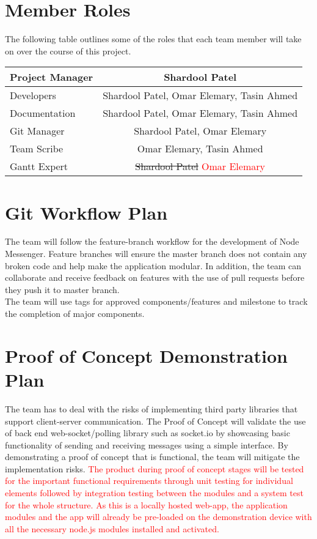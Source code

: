 \documentclass{article}
\begin{document}
\section{Member Roles}
The following table outlines some of the roles that each team member will take
on over the course of this project.
\begin{table}[h!]
  \centering
  \label{tab:table}
  \begin{tabular}{||l||c||}
\hline
     Project Manager & Shardool Patel \\
    \hline
     Developers & Shardool Patel, Omar Elemary, Tasin Ahmed \\
\hline
   Documentation & Shardool Patel, Omar Elemary, Tasin Ahmed  \\ \hline
   Git Manager & Shardool Patel, Omar Elemary\\ \hline
   Team Scribe & Omar Elemary, Tasin Ahmed\\ \hline
   Gantt Expert & \sout{Shardool Patel} \textcolor{red}{Omar Elemary}\\ \hline

  \end{tabular}

\end{table}
\section{Git Workflow Plan}
The team will follow the feature-branch workflow for the development of Node Messenger. Feature branches will ensure the master branch does not contain any broken code and help make the application modular. In addition, the team can collaborate and receive feedback on features with the use of pull requests before they push it to master branch. \\
The team will use tags for approved components/features and milestone to track the completion of major components. 
\section{Proof of Concept Demonstration Plan}
The team has to deal with the risks of implementing third party libraries that support client-server communication. The Proof of Concept will validate the use of back end web-socket/polling library such as socket.io by showcasing basic functionality of sending and receiving messages using a simple interface. By demonstrating a proof of concept that is functional, the team will mitigate the implementation risks. \textcolor{red}{The product during proof of concept stages will be tested for the important functional requirements through unit testing for individual elements followed by integration testing between the modules and a system test for the whole structure. As this is a locally hosted web-app, the application modules and the app will already be pre-loaded on the demonstration device with all the necessary node.js modules installed and activated.}
\end{document}
